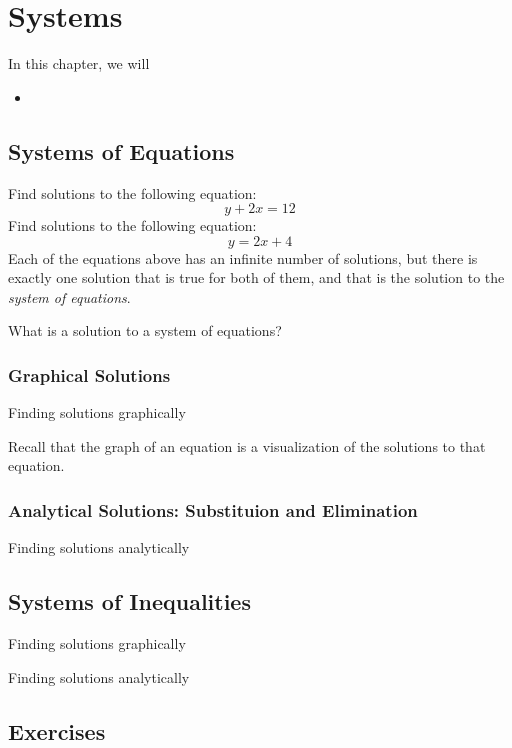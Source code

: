 
\chapter{Systems}

\begin{summary}
In this chapter, we will 
\begin{itemize}
    \item 
\end{itemize}
\end{summary}


\newpage 
\section{Systems of Equations}

Find solutions to the following equation: 
\[ y+2x=12 \]
Find solutions to the following equation: 
\[ y=2x+4 \]
Each of the equations above has an infinite number of solutions, but there is exactly one solution that is true for both of them, and that is the solution to the \emph{system of equations}.  



What is a solution to a system of equations?

\subsection{Graphical Solutions}
Finding solutions graphically

\begin{remark}
Recall that the graph of an equation is a visualization of the solutions to that equation.  
\end{remark}

\subsection{Analytical Solutions: Substituion and Elimination}
Finding solutions analytically 


\newpage 
\section{Systems of Inequalities}

Finding solutions graphically

Finding solutions analytically 



\newpage 
\section{Exercises} 